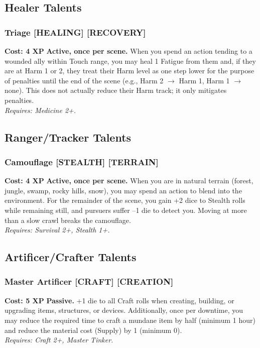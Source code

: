 \documentclass[12pt,a4paper]{book}
\begin{document}
\subsection*{Healer Talents}
\label{sec:major-healer}

\subsubsection*{Triage \textnormal{[HEALING] [RECOVERY]}}
\label{talent:triage}
\textbf{Cost: 4 XP} \textbf{Active, once per scene.} When you spend an action tending to a wounded ally within Touch range, you may heal 1 Fatigue from them and, if they are at Harm 1 or 2, they treat their Harm level as one step lower for the purpose of penalties until the end of the scene (e.g., Harm 2 $\rightarrow$ Harm 1, Harm 1 $\rightarrow$ none). This does not actually reduce their Harm track; it only mitigates penalties. \\
\textit{Requires: Medicine 2+.}

\subsection*{Ranger/Tracker Talents}
\label{sec:major-ranger}

\subsubsection*{Camouflage \textnormal{[STEALTH] [TERRAIN]}}
\label{talent:camouflage}
\textbf{Cost: 4 XP} \textbf{Active, once per scene.} When you are in natural terrain (forest, jungle, swamp, rocky hills, snow), you may spend an action to blend into the environment. For the remainder of the scene, you gain +2 dice to Stealth rolls while remaining still, and pursuers suffer --1 die to detect you. Moving at more than a slow crawl breaks the camouflage. \\
\textit{Requires: Survival 2+, Stealth 1+.}

\subsection*{Artificer/Crafter Talents}
\label{sec:major-artificer}

\subsubsection*{Master Artificer \textnormal{[CRAFT] [CREATION]}}
\label{talent:master-artificer}
\textbf{Cost: 5 XP} \textbf{Passive.} +1 die to all Craft rolls when creating, building, or upgrading items, structures, or devices. Additionally, once per downtime, you may reduce the required time to craft a mundane item by half (minimum 1 hour) and reduce the material cost (Supply) by 1 (minimum 0). \\
\textit{Requires: Craft 2+, Master Tinker.}
\end{document}

